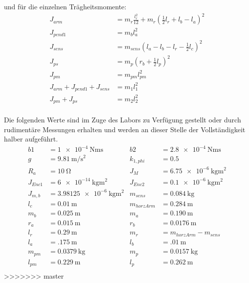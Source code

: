 und für die einzelnen Trägheitsmomente:
\begin{align*}
J_{arm} &= m_r \frac{l^2_r}{12}+m_r(\frac{1}{2}l_r+l_b-l_a)^2 \\
J_{pend1} &= m_bl^2_a \\
J_{sens} &= m_{sens}(l_a-l_b-l_r-\frac{1}{2}l_c)^2 \\
J_{ps} &= m_p(r_b+\frac{1}{2}l_p)^2 \\
J_{pm} &= m_{pm}l^2_{pm} \\
J_{arm}+J_{pend1}+J_{sens} &= m_1l^2_1 \\ 
J_{pm}+J_{ps} &= m_2l^2_2 \\
\end{align*}

Die folgenden Werte sind im Zuge des Labors zu Verfügung gestellt oder durch rudimentäre Messungen erhalten und werden an dieser Stelle der Vollständigkeit halber aufgeführt. 
\begin{align*}
b1 &= \SI{1e-4}{\newton\metre\second} &
b2 &= \SI{2.8e-4}{\newton\metre\second} \\
g &= \SI{9.81}{\metre\per\square\second} &
k_{1,phi} &= \SI{0.5}{}\\
R_a &= \SI{10}{\ohm} &
J_M  &=  \SI{6.75e-6}{\kilo\gram\square\metre}  \\        %
J_{Enc1}  &=  \SI{6e-14}{\kilo\gram\square\metre}  &        %
J_{Enc2}  &=  \SI{0.1e-6}{\kilo\gram\square\metre}  \\     %
J_{m,b}  &=  \SI{3.98125e-6}{\kilo\gram\square\metre}  &     %
m_{sens}  &=  \SI{0.084}{\kilo\gram}  \\
l_c  &=  \SI{0.01}{\metre}  &
m_{horzArm} &= \SI{0.284}{\metre} \\
m_b &= \SI{0.025}{\metre}  &
m_a &= \SI{0.190}{\metre} \\
r_a &= \SI{0.015}{\metre}  &
r_b &= \SI{0.0176}{\metre} \\
l_r &= \SI{0.29}{\metre} &
m_r  &=  m_{horzArm} - m_{sens}\\
l_a &= \SI{.175}{\metre} &
l_b &= \SI{.01}{\metre}\\
m_{pm} &= \SI{0.0379}{\kilo\gram} &
m_p &= \SI{0.0157}{\kilo\gram}\\
l_{pm} &= \SI{0.229}{\metre} &
l_p &= \SI{0.262}{\metre}\\
\end{align*}
>>>>>>> master


